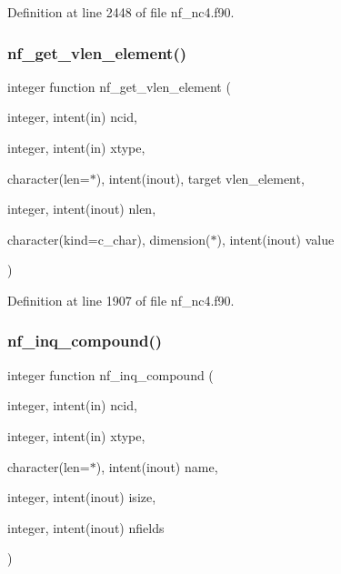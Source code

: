 Definition at line 2448 of file nf\+\_\+nc4.\+f90.

\mbox{\label{nf__nc4_8f90_afe58043bc27d91319d611319c7fcbccf}} 
\subsubsection{\texorpdfstring{nf\+\_\+get\+\_\+vlen\+\_\+element()}{nf\_get\_vlen\_element()}}
{\footnotesize\ttfamily integer function nf\+\_\+get\+\_\+vlen\+\_\+element (\begin{DoxyParamCaption}\item[{integer, intent(in)}]{ncid,  }\item[{integer, intent(in)}]{xtype,  }\item[{character(len=$\ast$), intent(inout), target}]{vlen\+\_\+element,  }\item[{integer, intent(inout)}]{nlen,  }\item[{character(kind=c\+\_\+char), dimension($\ast$), intent(inout)}]{value }\end{DoxyParamCaption})}



Definition at line 1907 of file nf\+\_\+nc4.\+f90.

\mbox{\label{nf__nc4_8f90_a62e92d7657430f2e1346be19e503e318}} 
\subsubsection{\texorpdfstring{nf\+\_\+inq\+\_\+compound()}{nf\_inq\_compound()}}
{\footnotesize\ttfamily integer function nf\+\_\+inq\+\_\+compound (\begin{DoxyParamCaption}\item[{integer, intent(in)}]{ncid,  }\item[{integer, intent(in)}]{xtype,  }\item[{character(len=$\ast$), intent(inout)}]{name,  }\item[{integer, intent(inout)}]{isize,  }\item[{integer, intent(inout)}]{nfields }\end{DoxyParamCaption})}




